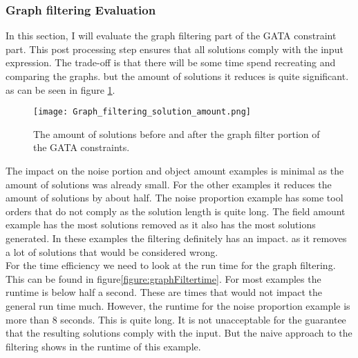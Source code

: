 \documentclass{article}
\begin{document}



\subsubsection{Graph filtering Evaluation}
In this section, I will evaluate the graph filtering part of the GATA constraint part. This post processing step ensures that all solutions comply with the input expression. The trade-off is that there will be some time spend recreating and comparing the graphs. but the amount of solutions it reduces is quite significant. as can be seen in figure \ref{figure:graphFilterAmount}. 


\begin{figure}[H]
  \centering
    \texttt{[image: Graph\_filtering\_solution\_amount.png]}
    \caption{The amount of solutions before and after the graph filter portion of the GATA constraints.}
    \label{figure:graphFilterAmount}
\end{figure}

The impact on the noise portion and object amount examples is minimal as the amount of solutions was already small. For the other examples it reduces the amount of solutions by about half. The noise proportion example has some tool orders that do not comply as the solution length is quite long. The field amount example has the most solutions removed as it also has the most solutions generated. In these examples the filtering definitely has an impact. as it removes a lot of solutions that would be considered wrong. \\

For the time efficiency we need to look at the run time for the graph filtering. This can be found in figure\ref{figure:graphFiltertime}. For most examples the runtime is below half a second. These are times that would not impact the general run time much. However, the runtime for the noise proportion example is more than 8 seconds. This is quite long. It is not unacceptable for the guarantee that the resulting solutions comply with the input. But the naive approach to the filtering shows in the runtime of this example. 


\end{document}
